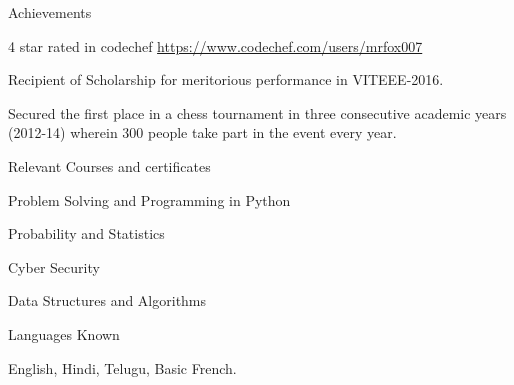 \documentclass{resume} %
\begin{document}

\begin{rSection}{Achievements} \itemsep -4pt
    \item 4 star rated in codechef \url{https://www.codechef.com/users/mrfox007}
    \item Recipient of Scholarship for meritorious performance in VITEEE-2016.
    \item Secured the first place in a chess tournament in three consecutive academic years (2012-14) wherein \phantom{x} 300 people take part in the event every year.
\end{rSection}

\begin{rSection}{Relevant Courses and certificates} \itemsep -3pt
    \item Problem Solving and Programming in Python 
    \item Probability and Statistics
    \item Cyber Security
    \item Data Structures and Algorithms
\end{rSection}

\begin{rSection}{Languages Known} \itemsep -2pt 
    \item English, Hindi, Telugu, Basic French.
\end{rSection}
\end{document}
